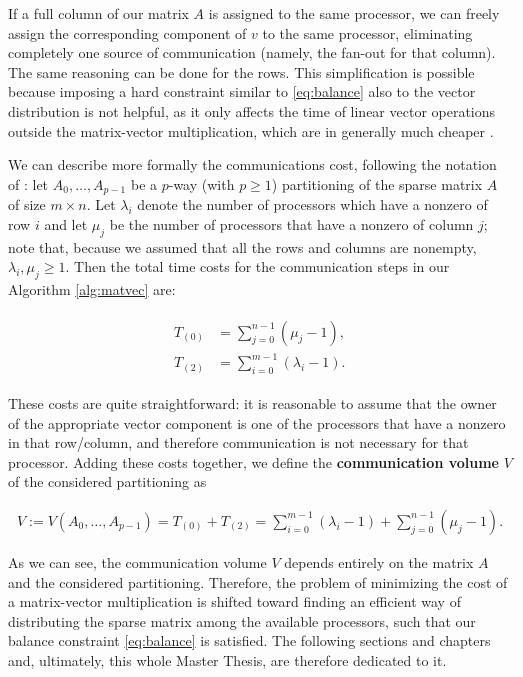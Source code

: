 If a full column of our matrix $A$ is assigned to the same processor, we can freely assign the corresponding component of $v$ to the same processor, eliminating completely one source of communication (namely, the fan-out for that column). The same reasoning can be done for the rows. This simplification is possible because imposing a hard constraint similar to \eqref{eq:balance} also to the vector distribution is not helpful, as it only affects the time of linear vector operations outside the matrix-vector multiplication, which are in generally much cheaper \cite[Sec.~3]{mondriaan}. 

We can describe more formally the communications cost, following the notation of \cite[Def.~2.1]{mondriaan}: let $A_0,\dots,A_{p-1}$ be a $p$-way (with $p \geq 1$) partitioning of the sparse matrix $A$ of size $m \times n$. Let $\lambda_i$ denote the number of processors which have a nonzero of row $i$ and let $\mu_j$ be the number of processors that have a nonzero of column $j$; note that, because we assumed that all the rows and columns are nonempty, $\lambda_i, \mu_j \geq 1$. Then the total time costs for the communication steps in our Algorithm \ref{alg:matvec} are:

\begin{align}
	\begin{aligned}
		T_{(0)} &= \sum_{j=0}^{n-1} (\mu_j -1), \\
		T_{(2)} &= \sum_{i=0}^{m-1} (\lambda_i -1).
	\end{aligned} \label{eq:T_comm}
\end{align}

These costs are quite straightforward: it is reasonable to assume that the owner of the appropriate vector component is one of the processors that have a nonzero in that row/column, and therefore communication is not necessary for that processor. Adding these costs together, we define the \textbf{communication volume} $V$ of the considered partitioning as

\begin{align}
	V := V(A_0,\dots,A_{p-1}) = T_{(0)} + T_{(2)} = \sum_{i=0}^{m-1} (\lambda_i -1) + \sum_{j=0}^{n-1} (\mu_j-1).
	\label{eq:volume}
\end{align}

As we can see, the communication volume $V$ depends entirely on the matrix $A$ and the considered partitioning. Therefore, the problem of minimizing the cost of a matrix-vector multiplication is shifted toward finding an efficient way of distributing the sparse matrix among the available processors, such that our balance constraint \eqref{eq:balance} is satisfied. The following sections and chapters and, ultimately, this whole Master Thesis, are therefore dedicated to it.

